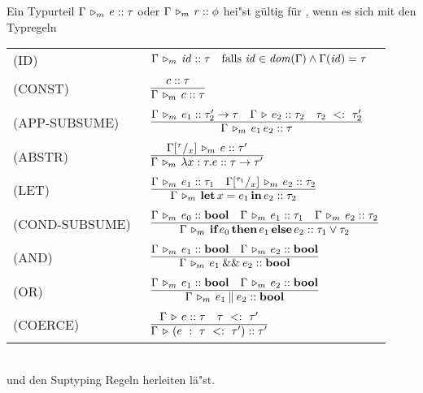   Ein Typurteil $\Gamma\,\triangleright_m\,e\mathrel{::}\tau$ oder $\Gamma\,\triangleright_m\,r\mathrel{::}\phi$ hei"st g\"ultig f\"ur \Lom,
  wenn es sich mit den Typregeln  \\[5mm]
  \begin{tabular}{ll} 
    \mbox{(ID)\ }           & $\Gamma\,\triangleright_m\,{\text{\it id\/}}\mathrel{::}\tau \quad \text{falls } {\text{\it id\/}}\in{\text{\it dom\/}}(\Gamma) \wedge \Gamma({\text{\it id\/}}) = \tau$ \\[1mm]
    \mbox{(CONST)\ }        & $\RULE{\tj{c}{\tau}}
                              {\Tjm{\Gamma}{c}{\tau}}$ \\[4mm]
    \mbox{(APP-SUBSUME)\ }  & $\RULE{\Tjm{\Gamma}{e_1}{\typeArrow{\tau_2'}{\tau}}
                               \quad
                               \Tj{\Gamma}{e_2}{\tau_2}
                               \quad
                               \subtype{\tau_2} {\tau_2'}}
                              {\Tjm{\Gamma}{\expApp{e_1}{e_2}}{\tau}}$ \\[4mm]
    \mbox{(ABSTR)\ }        & $\RULE{\Tjm{\Gamma\SUB{\tau}{x}}{e}{\tau'}}
                              {\Tjm{\Gamma}{\expAbstr{x:\tau}{e}}{\typeArrow{\tau}{\tau'}}}$ \\[4mm]
    \mbox{(LET)\ }          & $\RULE{\Tjm{\Gamma}{e_1}{\tau_1}
                               \quad
                               \Tjm{\Gamma\SUB{\tau_1}{x}}{e_2}{\tau_2}}
                              {\Tjm{\Gamma}{\expLet{x}{e_1}{e_2}}{\tau_2}}$ \\[4mm]
   \mbox{(COND-SUBSUME)\ } & $\RULE{\Tjm{\Gamma}{e_0}{\bool}
                               \quad
                               \Tjm{\Gamma}{e_1}{\tau_1}
                               \quad
                               \Tjm{\Gamma}{e_2}{\tau_2}}
                              {\Tjm{\Gamma}{\expCond{e_0}{e_1}{e_2}}{\tau_1 \vee \tau_2}}$ \\[4mm]
  \mbox{(AND)\ } & $\regel{\Tjm{\Gamma}{e_1}{\bool} \quad \Tjm{\Gamma}{e_2}{\bool}}
                          {\Tjm{\Gamma}{\andalso{e_1}{e_2}}{\bool}}$ \\[4mm]
  \mbox{(OR)\  } & $\regel{\Tjm{\Gamma}{e_1}{\bool} \quad \Tjm{\Gamma}{e_2}{\bool}}
                          {\Tjm{\Gamma}{\orelse{e_1}{e_2}}{\bool}}$\\[4mm]
   \mbox{(COERCE)\ } & $\regel{\Tj{\Gamma}{e}{\tau} \quad \subtype{\tau}{\tau'}} 
                          {\Tj{\Gamma}{\coercion{e}{\tau}{\tau'}}{\tau'}}$
   
  \end{tabular} \\[7mm]
  und den Suptyping Regeln herleiten l\"a"st.



